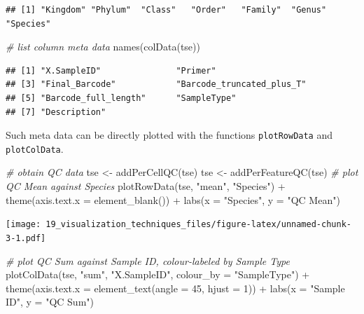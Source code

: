 \documentclass[
]{book}
\newenvironment{Shaded}{\begin{snugshade}}{\end{snugshade}}
\newcommand{\AttributeTok}[1]{\textcolor[rgb]{0.77,0.63,0.00}{#1}}
\newcommand{\CommentTok}[1]{\textcolor[rgb]{0.56,0.35,0.01}{\textit{#1}}}
\newcommand{\DecValTok}[1]{\textcolor[rgb]{0.00,0.00,0.81}{#1}}
\newcommand{\FunctionTok}[1]{\textcolor[rgb]{0.00,0.00,0.00}{#1}}
\newcommand{\NormalTok}[1]{#1}
\newcommand{\OtherTok}[1]{\textcolor[rgb]{0.56,0.35,0.01}{#1}}
\newcommand{\SpecialCharTok}[1]{\textcolor[rgb]{0.00,0.00,0.00}{#1}}
\newcommand{\StringTok}[1]{\textcolor[rgb]{0.31,0.60,0.02}{#1}}
\begin{document}
\begin{verbatim}
## [1] "Kingdom" "Phylum"  "Class"   "Order"   "Family"  "Genus"   "Species"
\end{verbatim}

\begin{Shaded}
\begin{Highlighting}[]
\CommentTok{\# list column meta data}
\FunctionTok{names}\NormalTok{(}\FunctionTok{colData}\NormalTok{(tse))}
\end{Highlighting}
\end{Shaded}

\begin{verbatim}
## [1] "X.SampleID"               "Primer"                  
## [3] "Final_Barcode"            "Barcode_truncated_plus_T"
## [5] "Barcode_full_length"      "SampleType"              
## [7] "Description"
\end{verbatim}

Such meta data can be directly plotted with the functions
\texttt{plotRowData} and \texttt{plotColData}.

\begin{Shaded}
\begin{Highlighting}[]
\CommentTok{\# obtain QC data}
\NormalTok{tse }\OtherTok{\textless{}{-}} \FunctionTok{addPerCellQC}\NormalTok{(tse)}
\NormalTok{tse }\OtherTok{\textless{}{-}} \FunctionTok{addPerFeatureQC}\NormalTok{(tse)}
\CommentTok{\# plot QC Mean against Species}
\FunctionTok{plotRowData}\NormalTok{(tse, }\StringTok{"mean"}\NormalTok{, }\StringTok{"Species"}\NormalTok{) }\SpecialCharTok{+}
  \FunctionTok{theme}\NormalTok{(}\AttributeTok{axis.text.x =} \FunctionTok{element\_blank}\NormalTok{()) }\SpecialCharTok{+}
  \FunctionTok{labs}\NormalTok{(}\AttributeTok{x =} \StringTok{"Species"}\NormalTok{, }\AttributeTok{y =} \StringTok{"QC Mean"}\NormalTok{)}
\end{Highlighting}
\end{Shaded}

\texttt{[image: 19\_visualization\_techniques\_files/figure-latex/unnamed-chunk-3-1.pdf]}

\begin{Shaded}
\begin{Highlighting}[]
\CommentTok{\# plot QC Sum against Sample ID, colour{-}labeled by Sample Type}
\FunctionTok{plotColData}\NormalTok{(tse, }\StringTok{"sum"}\NormalTok{, }\StringTok{"X.SampleID"}\NormalTok{, }\AttributeTok{colour\_by =} \StringTok{"SampleType"}\NormalTok{) }\SpecialCharTok{+}
  \FunctionTok{theme}\NormalTok{(}\AttributeTok{axis.text.x =} \FunctionTok{element\_text}\NormalTok{(}\AttributeTok{angle =} \DecValTok{45}\NormalTok{, }\AttributeTok{hjust =} \DecValTok{1}\NormalTok{)) }\SpecialCharTok{+}
  \FunctionTok{labs}\NormalTok{(}\AttributeTok{x =} \StringTok{"Sample ID"}\NormalTok{, }\AttributeTok{y =} \StringTok{"QC Sum"}\NormalTok{)}
\end{Highlighting}
\end{Shaded}
\end{document}

